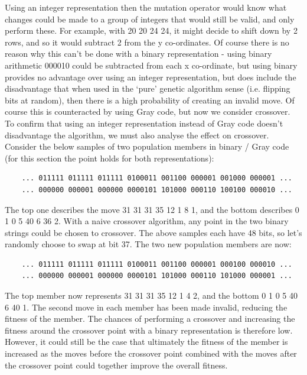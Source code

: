 \documentclass[]{report}
\begin{document}
Using an integer representation then the mutation operator would know what changes could be made to a group of integers that would still be valid, and only perform these. For example, with 20 20 24 24, it might decide to shift down by 2 rows, and so it would subtract 2 from the y co-ordinates. Of course there is no reason why this can't be done with a binary representation - using binary arithmetic 000010 could be subtracted from each x co-ordinate, but using binary provides no advantage over using an integer representation, but does include the disadvantage that when used in the `pure' genetic algorithm sense (i.e. flipping bits at random), then there is a high probability of creating an invalid move. Of course this is counteracted by using Gray code, but now we consider crossover. \\

To confirm that using an integer representation instead of Gray code doesn't disadvantage the algorithm, we must also analyse the effect on crossover. Consider the below samples of two population members in binary / Gray code (for this section the point holds for both representations):

\begin{verbatim}
	... 011111 011111 011111 0100011 001100 000001 001000 000001 ...
	... 000000 000001 000000 0000101 101000 000110 100100 000010 ...
\end{verbatim}

The top one describes the move 31 31 31 35 12 1 8 1, and the bottom describes 0 1 0 5 40 6 36 2. With a naive crossover algorithm, any point in the two binary strings could be chosen to crossover. The above samples each have 48 bits, so let's randomly choose to swap at bit 37. The two new population members are now:

\begin{verbatim}
	... 011111 011111 011111 0100011 001100 000001 000100 000010 ...
	... 000000 000001 000000 0000101 101000 000110 101000 000001 ...
\end{verbatim}

The top member now represents 31 31 31 35 12 1 4 2, and the bottom 0 1 0 5 40 6 40 1. The second move in each member has been made invalid, reducing the fitness of the member. The chances of performing a crossover and increasing the fitness around the crossover point with a binary representation is therefore low. However, it could still be the case that ultimately the fitness of the member is increased as the moves before the crossover point combined with the moves after the crossover point could together improve the overall fitness. \\
\end{document}
